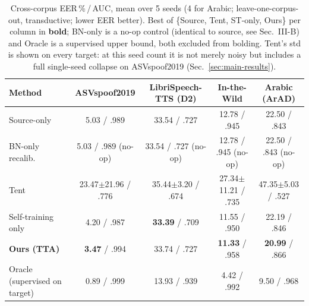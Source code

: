 \documentclass[conference]{IEEEtran}
\begin{document}
\begin{table}[t]
\centering
\caption{Cross-corpus EER\,\%\,/\,AUC, mean over 5 seeds (4 for Arabic;
leave-one-corpus-out, transductive; lower EER better). Best of \{Source, Tent,
ST-only, Ours\} per column in \textbf{bold}; BN-only is a no-op control
(identical to source, see Sec.~III-B) and Oracle is a supervised upper bound,
both excluded from bolding. Tent's std is shown on every target: at this seed
count it is not merely noisy but includes a full single-seed collapse on
ASVspoof2019 (Sec.~\ref{sec:main-results}).}
\label{tab:main}
\begin{tabular}{@{}lcccc@{}}
\toprule
Method & ASVspoof2019 & LibriSpeech-TTS (D2) & In-the-Wild & Arabic (ArAD) \\
\midrule
Source-only & 5.03 / .989 & 33.54 / .727 & 12.78 / .945 & 22.50 / .843 \\
BN-only recalib.~\cite{adabn} & 5.03 / .989 (no-op) & 33.54 / .727 (no-op) & 12.78 / .945 (no-op) & 22.50 / .843 (no-op) \\
Tent~\cite{tent} & 23.47$\pm$21.96 / .776 & 35.44$\pm$3.20 / .674 & 27.34$\pm$11.21 / .735 & 47.35$\pm$5.03 / .527 \\
Self-training only & 4.20 / .987 & \textbf{33.39} / .709 & 11.55 / .950 & 22.19 / .846 \\
\rowcolor{green!12}\textbf{Ours (TTA)} & \textbf{3.47} / .994 & 33.74 / .727 & \textbf{11.33} / .958 & \textbf{20.99} / .866 \\
\midrule
Oracle (supervised on target) & 0.89 / .999 & 13.93 / .939 & 4.42 / .992 & 9.50 / .968 \\
\bottomrule
\end{tabular}
\end{table}
\end{document}
